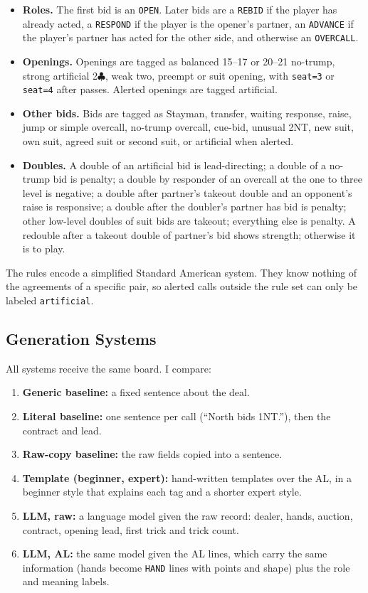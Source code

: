 \documentclass[11pt]{article}
\newcommand{\suitC}{$\clubsuit$}
\begin{document}
\begin{itemize}[leftmargin=*,itemsep=1pt]
    \item \textbf{Roles.} The first bid is an \texttt{OPEN}. Later bids are a \texttt{REBID} if the player has already acted, a \texttt{RESPOND} if the player is the opener's partner, an \texttt{ADVANCE} if the player's partner has acted for the other side, and otherwise an \texttt{OVERCALL}.
    \item \textbf{Openings.} Openings are tagged as balanced 15--17 or 20--21 no-trump, strong artificial 2\suitC{}, weak two, preempt or suit opening, with \texttt{seat=3} or \texttt{seat=4} after passes. Alerted openings are tagged artificial.
    \item \textbf{Other bids.} Bids are tagged as Stayman, transfer, waiting response, raise, jump or simple overcall, no-trump overcall, cue-bid, unusual 2NT, new suit, own suit, agreed suit or second suit, or artificial when alerted.
    \item \textbf{Doubles.} A double of an artificial bid is lead-directing; a double of a no-trump bid is penalty; a double by responder of an overcall at the one to three level is negative; a double after partner's takeout double and an opponent's raise is responsive; a double after the doubler's partner has bid is penalty; other low-level doubles of suit bids are takeout; everything else is penalty. A redouble after a takeout double of partner's bid shows strength; otherwise it is to play.
\end{itemize}

The rules encode a simplified Standard American system. They know nothing of the agreements of a specific pair, so alerted calls outside the rule set can only be labeled \texttt{artificial}.

\subsection{Generation Systems}

All systems receive the same board. I compare:

\begin{enumerate}[leftmargin=*,itemsep=1pt]
    \item \textbf{Generic baseline:} a fixed sentence about the deal.
    \item \textbf{Literal baseline:} one sentence per call (``North bids 1NT.''), then the contract and lead.
    \item \textbf{Raw-copy baseline:} the raw fields copied into a sentence.
    \item \textbf{Template (beginner, expert):} hand-written templates over the AL, in a beginner style that explains each tag and a shorter expert style.
    \item \textbf{LLM, raw:} a language model given the raw record: dealer, hands, auction, contract, opening lead, first trick and trick count.
    \item \textbf{LLM, AL:} the same model given the AL lines, which carry the same information (hands become \texttt{HAND} lines with points and shape) plus the role and meaning labels.
\end{enumerate}
\end{document}

